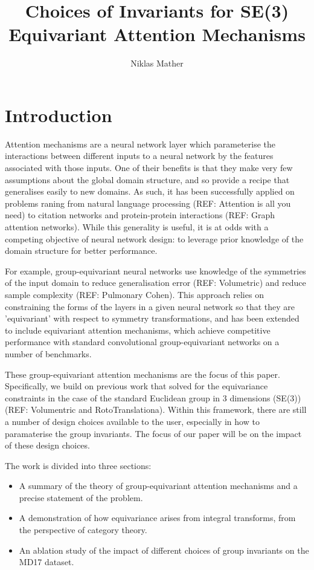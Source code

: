 \documentclass[11pt]{article}
\begin{document}
\title{Choices of Invariants for SE(3) Equivariant Attention Mechanisms}
\author{Niklas Mather}
\maketitle

\section{Introduction}

Attention mechanisms are a neural network layer which parameterise the interactions between different inputs to a neural network by the features associated with those inputs. One of their benefits is that they make very few assumptions about the global domain structure, and so provide a recipe that generalises easily to new domains. As such, it has been successfully applied on problems raning from natural language processing (REF: Attention is all you need) to citation networks  and protein-protein interactions (REF: Graph attention networks). While this generality is useful, it is at odds with a competing objective of neural network design: to leverage prior knowledge of the domain structure for better performance.

For example, group-equivariant neural networks use knowledge of the symmetries of the input domain to reduce generalisation error (REF: Volumetric) and reduce sample complexity (REF: Pulmonary Cohen). This approach relies on constraining the forms of the layers in a given neural network so that they are 'equivariant' with respect to symmetry transformations, and has been extended to include equivariant attention mechanisms, which achieve competitive performance with standard convolutional group-equivariant networks on a number of benchmarks.

These group-equivariant attention mechanisms are the focus of this paper. Specifically, we build on previous work that solved for the equivariance constraints in the case of the standard Euclidean group in 3 dimensions (SE(3)) (REF: Volumentric and RotoTranslationa). Within this framework, there are still a number of design choices available to the user, especially in how to paramaterise the group invariants. The focus of our paper will be on the impact of these design choices.

The work is divided into three sections: \begin{itemize}
	\item A summary of the theory of group-equivariant attention mechanisms and a precise statement of the problem.
	\item A demonstration of how equivariance arises from integral transforms, from the perspective of category theory.
	\item An ablation study of the impact of different choices of group invariants on the MD17 dataset. 
\end{itemize}
\end{document}
